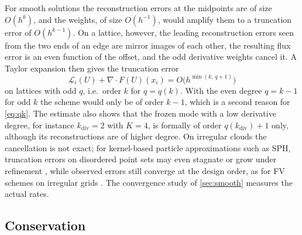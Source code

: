 \documentclass[11pt,a4paper]{article}
\numberwithin{equation}{section}
\newcommand{\Lop}{\mathcal{L}}
\newcommand{\qdiv}{q}
\begin{document}
For smooth solutions the reconstruction errors at the midpoints are of size $O(h^k)$, and the weights, of size $O(h^{-1})$, would amplify them to a truncation error of $O(h^{k-1})$. On a lattice, however, the leading reconstruction errors seen from the two ends of an edge are mirror images of each other, the resulting flux error is an even function of the offset, and the odd derivative weights cancel it. A Taylor expansion then gives the truncation error
\begin{equation}\label{eq:lattice}
\Lop_i(U) + \nabla\cdot F(U)(x_i) = O\big(h^{\min(k,\,q+1)}\big)
\end{equation}
on lattices with odd $q$, i.e.\ order $k$ for $q=\qdiv(k)$. With the even degree $q=k-1$ for odd $k$ the scheme would only be of order $k-1$, which is a second reason for \eqref{eq:qk}. The estimate also shows that the frozen mode with a low derivative degree, for instance $k_{\mathrm{div}}=2$ with $K=4$, is formally of order $\qdiv(k_{\mathrm{div}})+1$ only, although its reconstructions are of higher degree. On irregular clouds the cancellation is not exact; for kernel-based particle approximations such as SPH, truncation errors on disordered point sets may even stagnate or grow under refinement \cite{Quinlan2006}, while observed errors still converge at the design order, as for FV schemes on irregular grids \cite{Diskin2010}. The convergence study of \cref{sec:smooth} measures the actual rates.

\subsection{Conservation}\label{sec:conservation}
\end{document}
